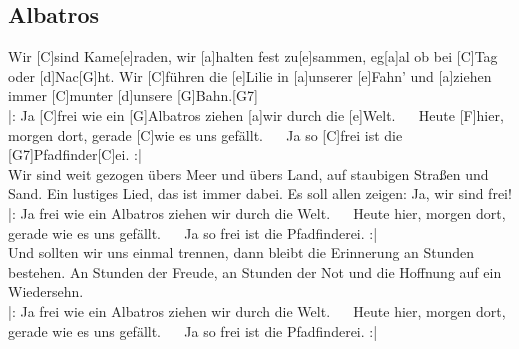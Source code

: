 \documentclass[10pt,a5paper,twoside, cleardoubleplain]{scrbook}
\begin{document}
\subsection{Albatros}
\begin{guitar}
Wir [C]sind Kame[e]raden, wir [a]halten fest zu[e]sammen,
eg[a]al ob bei [C]Tag oder [d]Nac[G]ht.
Wir [C]führen die [e]Lilie in [a]unserer [e]Fahn'
und [a]ziehen immer [C]munter [d]unsere [G]Bahn.[G7]
\\
|: Ja [C]frei wie ein [G]Albatros ziehen [a]wir durch die [e]Welt.
~~ Heute [F]hier, morgen dort, gerade [C]wie es uns gefällt.
~~ Ja so [C]frei ist die [G7]Pfadfinder[C]ei. :|
\\
Wir sind weit gezogen übers Meer und übers Land,
auf staubigen Straßen und Sand.
Ein lustiges Lied, das ist immer dabei.
Es soll allen zeigen: Ja, wir sind frei!
\\
|: Ja frei wie ein Albatros ziehen wir durch die Welt.
~~ Heute hier, morgen dort, gerade wie es uns gefällt. 
~~ Ja so frei ist die Pfadfinderei. :|
\\
Und sollten wir uns einmal trennen, dann bleibt
die Erinnerung an Stunden bestehen.
An Stunden der Freude, an Stunden der Not 
und die Hoffnung auf ein Wiedersehn.
\\
|: Ja frei wie ein Albatros ziehen wir durch die Welt.
~~ Heute hier, morgen dort, gerade wie es uns gefällt. 
~~ Ja so frei ist die Pfadfinderei. :|
\end{guitar}

  	
  	  
\newpage  
  	
\end{document}
